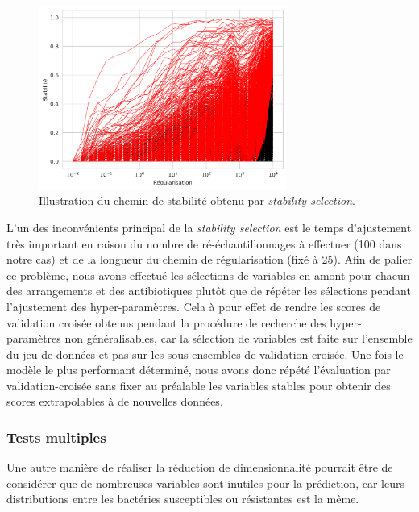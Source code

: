 \documentclass[11pt]{article}
\begin{document}
  \begin{figure}[H]
    \centering
    \includegraphics[height=6cm,width=\textwidth,keepaspectratio]{stab_sel}
    \caption{Illustration du chemin de stabilité obtenu par \textit{stability selection}.}
    \label{fig:stab_path}
  \end{figure}

  L'un des inconvénients principal de la \textit{stability selection} est le temps d'ajustement très important en raison du nombre de ré-échantillonnages à effectuer (100 dans notre cas) et de la longueur du chemin de régularisation (fixé à 25).
  Afin de palier ce problème, nous avons effectué les sélections de variables en amont pour chacun des arrangements et des antibiotiques plutôt que de répéter les sélections pendant l'ajustement des hyper-paramètres.
  Cela à pour effet de rendre les scores de validation croisée obtenus pendant la procédure de recherche des hyper-paramètres non généralisables, car la sélection de variables est faite sur l'ensemble du jeu de données et pas sur les sous-ensembles de validation croisée.
  Une fois le modèle le plus performant déterminé, nous avons donc répété l'évaluation par validation-croisée sans fixer au préalable les variables stables pour obtenir des scores extrapolables à de nouvelles données.

\hypertarget{tests-multiples}{%
\subsubsection{Tests multiples}\label{tests-multiples}}

  Une autre manière de réaliser la réduction de dimensionnalité pourrait être de considérer que de nombreuses variables sont inutiles pour la prédiction, car leurs distributions entre les bactéries susceptibles ou résistantes est la même.
\end{document}

